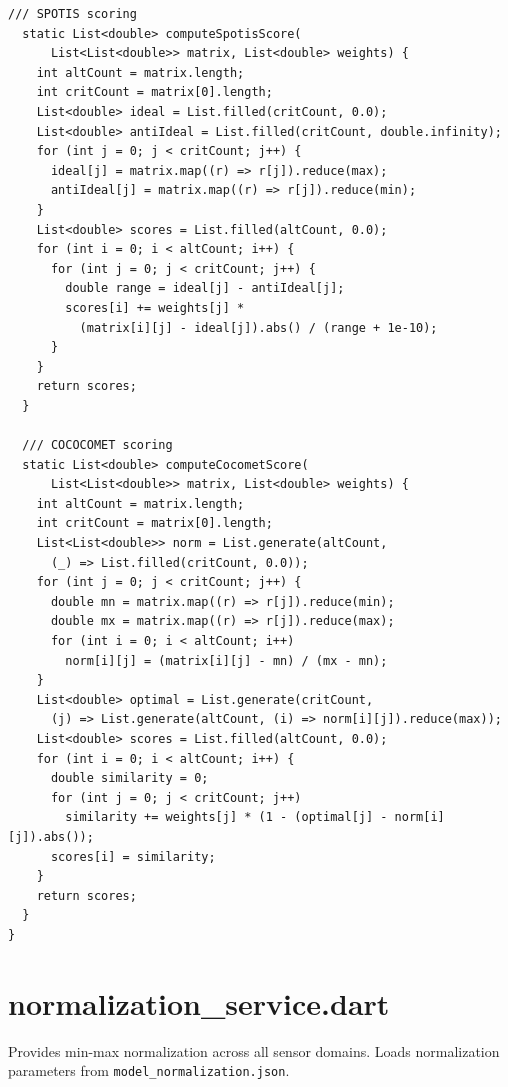 \documentclass[12pt,a4paper,oneside]{report}
\begin{document}
\begin{lstlisting}[style=dartstyle]
  /// SPOTIS scoring
  static List<double> computeSpotisScore(
      List<List<double>> matrix, List<double> weights) {
    int altCount = matrix.length;
    int critCount = matrix[0].length;
    List<double> ideal = List.filled(critCount, 0.0);
    List<double> antiIdeal = List.filled(critCount, double.infinity);
    for (int j = 0; j < critCount; j++) {
      ideal[j] = matrix.map((r) => r[j]).reduce(max);
      antiIdeal[j] = matrix.map((r) => r[j]).reduce(min);
    }
    List<double> scores = List.filled(altCount, 0.0);
    for (int i = 0; i < altCount; i++) {
      for (int j = 0; j < critCount; j++) {
        double range = ideal[j] - antiIdeal[j];
        scores[i] += weights[j] *
          (matrix[i][j] - ideal[j]).abs() / (range + 1e-10);
      }
    }
    return scores;
  }

  /// COCOCOMET scoring
  static List<double> computeCocometScore(
      List<List<double>> matrix, List<double> weights) {
    int altCount = matrix.length;
    int critCount = matrix[0].length;
    List<List<double>> norm = List.generate(altCount,
      (_) => List.filled(critCount, 0.0));
    for (int j = 0; j < critCount; j++) {
      double mn = matrix.map((r) => r[j]).reduce(min);
      double mx = matrix.map((r) => r[j]).reduce(max);
      for (int i = 0; i < altCount; i++)
        norm[i][j] = (matrix[i][j] - mn) / (mx - mn);
    }
    List<double> optimal = List.generate(critCount,
      (j) => List.generate(altCount, (i) => norm[i][j]).reduce(max));
    List<double> scores = List.filled(altCount, 0.0);
    for (int i = 0; i < altCount; i++) {
      double similarity = 0;
      for (int j = 0; j < critCount; j++)
        similarity += weights[j] * (1 - (optimal[j] - norm[i][j]).abs());
      scores[i] = similarity;
    }
    return scores;
  }
}
\end{lstlisting}

\section{normalization\_service.dart}

Provides min-max normalization across all sensor domains. Loads normalization parameters from \texttt{model\_normalization.json}.
\end{document}
